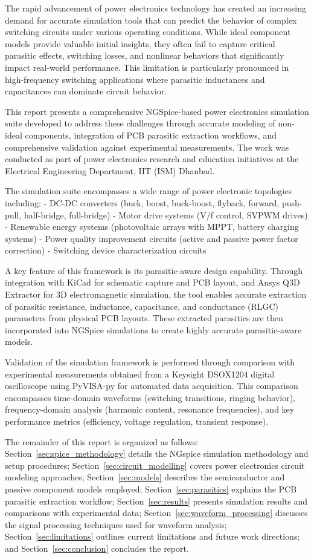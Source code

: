The rapid advancement of power electronics technology has created an increasing demand for accurate simulation tools that can predict the behavior of complex switching circuits under various operating conditions. While ideal component models provide valuable initial insights, they often fail to capture critical parasitic effects, switching losses, and nonlinear behaviors that significantly impact real-world performance. This limitation is particularly pronounced in high-frequency switching applications where parasitic inductances and capacitances can dominate circuit behavior.

This report presents a comprehensive NGSpice-based power electronics simulation suite developed to address these challenges through accurate modeling of non-ideal components, integration of PCB parasitic extraction workflows, and comprehensive validation against experimental measurements. The work was conducted as part of power electronics research and education initiatives at the Electrical Engineering Department, IIT (ISM) Dhanbad.

The simulation suite encompasses a wide range of power electronic topologies including:
- DC-DC converters (buck, boost, buck-boost, flyback, forward, push-pull, half-bridge, full-bridge)
- Motor drive systems (V/f control, SVPWM drives)
- Renewable energy systems (photovoltaic arrays with MPPT, battery charging systems)
- Power quality improvement circuits (active and passive power factor correction)
- Switching device characterization circuits

A key feature of this framework is its parasitic-aware design capability. Through integration with KiCad for schematic capture and PCB layout, and Ansys Q3D Extractor for 3D electromagnetic simulation, the tool enables accurate extraction of parasitic resistance, inductance, capacitance, and conductance (RLGC) parameters from physical PCB layouts. These extracted parasitics are then incorporated into NGSpice simulations to create highly accurate parasitic-aware models.

Validation of the simulation framework is performed through comparison with experimental measurements obtained from a Keysight DSOX1204 digital oscilloscope using PyVISA-py for automated data acquisition. This comparison encompasses time-domain waveforms (switching transitions, ringing behavior), frequency-domain analysis (harmonic content, resonance frequencies), and key performance metrics (efficiency, voltage regulation, transient response).

The remainder of this report is organized as follows: Section~\ref{sec:spice_methodology} details the NGspice simulation methodology and setup procedures; Section~\ref{sec:circuit_modelling} covers power electronics circuit modeling approaches; Section~\ref{sec:models} describes the semiconductor and passive component models employed; Section~\ref{sec:parasitics} explains the PCB parasitic extraction workflow; Section~\ref{sec:results} presents simulation results and comparisons with experimental data; Section~\ref{sec:waveform_processing} discusses the signal processing techniques used for waveform analysis; Section~\ref{sec:limitations} outlines current limitations and future work directions; and Section~\ref{sec:conclusion} concludes the report.
